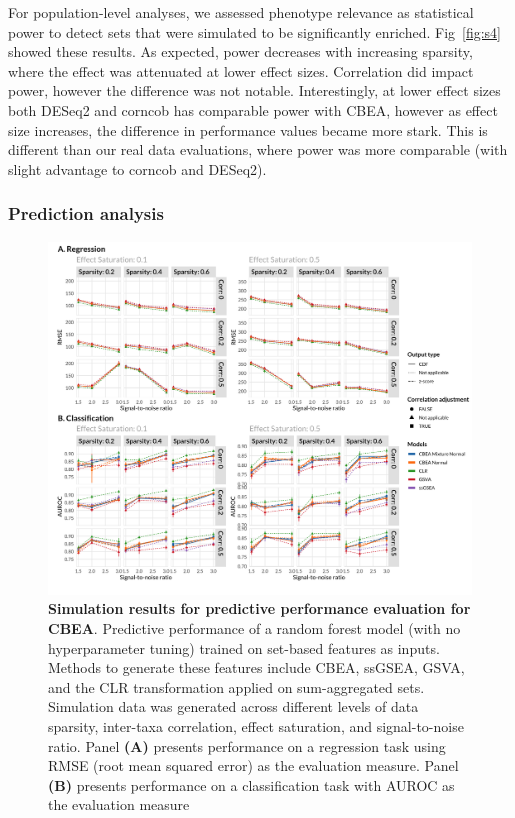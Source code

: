 \documentclass{article}
\begin{document}
For population-level analyses, we assessed phenotype relevance as statistical power to detect sets that were simulated to be significantly enriched. Fig~\ref{fig:s4} showed these results. As expected, power decreases with increasing sparsity, where the effect was attenuated at lower effect sizes. Correlation did impact power, however the difference was not notable. Interestingly, at lower effect sizes both DESeq2 and corncob has comparable power with CBEA, however as effect size increases, the difference in performance values became more stark. This is different than our real data evaluations, where power was more comparable (with slight advantage to corncob and DESeq2). 


\subsubsection{Prediction analysis}

\begin{figure}[!h]
    \centering
    \includegraphics[width = \linewidth]{figures/sim_pred_combined.png}
    \caption{\textbf{Simulation results for predictive performance evaluation for CBEA}. Predictive performance of a random forest model (with no hyperparameter tuning) trained on set-based features as inputs. Methods to generate these features include CBEA, ssGSEA, GSVA, and the CLR transformation applied on sum-aggregated sets. Simulation data was generated across different levels of data sparsity, inter-taxa correlation, effect saturation, and signal-to-noise ratio. Panel \textbf{(A)} presents performance on a regression task using RMSE (root mean squared error) as the evaluation measure. Panel \textbf{(B)} presents performance on a classification task with AUROC as the evaluation measure}
    \label{fig:s5}
\end{figure}
\end{document}
